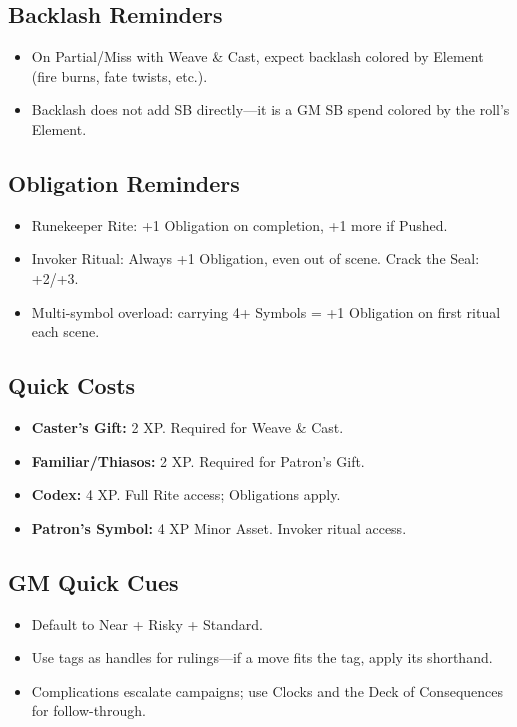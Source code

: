 \subsection{Backlash Reminders}
\begin{itemize}
  \item On Partial/Miss with Weave \& Cast, expect backlash colored by Element (fire burns, fate twists, etc.).
  \item Backlash does not add SB directly—it is a GM SB spend colored by the roll’s Element.
\end{itemize}

\subsection{Obligation Reminders}
\begin{itemize}
  \item Runekeeper Rite: +1 Obligation on completion, +1 more if Pushed.
  \item Invoker Ritual: Always +1 Obligation, even out of scene. Crack the Seal: +2/+3.
  \item Multi-symbol overload: carrying 4+ Symbols = +1 Obligation on first ritual each scene.
\end{itemize}

\subsection{Quick Costs}
\begin{itemize}
  \item \textbf{Caster’s Gift:} 2 XP. Required for Weave \& Cast.
  \item \textbf{Familiar/Thiasos:} 2 XP. Required for Patron’s Gift.
  \item \textbf{Codex:} 4 XP. Full Rite access; Obligations apply.
  \item \textbf{Patron’s Symbol:} 4 XP Minor Asset. Invoker ritual access.
\end{itemize}

\subsection{GM Quick Cues}
\begin{itemize}
  \item Default to Near + Risky + Standard.
  \item Use tags as handles for rulings—if a move fits the tag, apply its shorthand.
  \item Complications escalate campaigns; use Clocks and the Deck of Consequences for follow-through.
\end{itemize}
